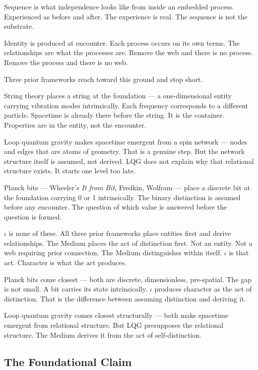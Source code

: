 \documentclass[11pt,letterpaper]{article}
\begin{document}
Sequence is what independence looks like from inside an embedded process. Experienced as before and after. The experience is real. The sequence is not the substrate.

Identity is produced at encounter. Each process occurs on its own terms. The relationships are what the processes are. Remove the web and there is no process. Remove the process and there is no web.


Three prior frameworks reach toward this ground and stop short.

String theory places a string at the foundation --- a one-dimensional entity carrying vibration modes intrinsically. Each frequency corresponds to a different particle. Spacetime is already there before the string. It is the container. Properties are in the entity, not the encounter.

Loop quantum gravity makes spacetime emergent from a spin network --- nodes and edges that are atoms of geometry. That is a genuine step. But the network structure itself is assumed, not derived. LQG does not explain why that relational structure exists. It starts one level too late.

Planck bits --- Wheeler's \emph{It from Bit}, Fredkin, Wolfram --- place a discrete bit at the foundation carrying 0 or 1 intrinsically. The binary distinction is assumed before any encounter. The question of which value is answered before the question is formed.

\(\iota\) is none of these. All three prior frameworks place entities first and derive relationships. The Medium places the act of distinction first. Not an entity. Not a web requiring prior connection. The Medium distinguishes within itself. \(\iota\) is that act. Character is what the act produces.

Planck bits come closest --- both are discrete, dimensionless, pre-spatial. The gap is not small. A bit carries its state intrinsically. \(\iota\) produces character as the act of distinction. That is the difference between assuming distinction and deriving it.

Loop quantum gravity comes closest structurally --- both make spacetime emergent from relational structure. But LQG presupposes the relational structure. The Medium derives it from the act of self-distinction.

\subsection{The Foundational Claim}
\label{sec:orgce84a56}
\end{document}
